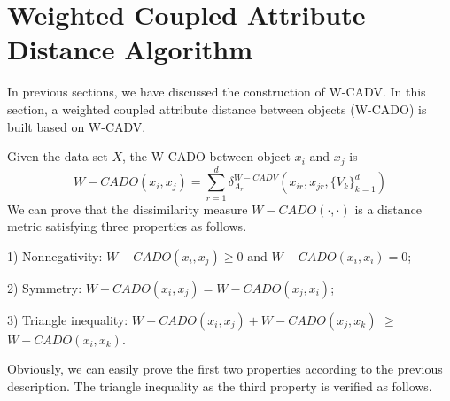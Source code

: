 \documentclass[review]{elsarticle}
\begin{document}
\section{Weighted Coupled Attribute Distance Algorithm}
In previous sections, we have discussed the construction of W-CADV. In this section, a weighted coupled attribute distance between objects (W-CADO) is built based on W-CADV.

Given the data set $X$, the W-CADO between object $x_i$ and $x_j$ is
\begin{equation}
W-CADO(x_i,x_j) = \sum_{r=1}^{d}\delta_{A_r}^{W-CADV}(x_{ir},x_{jr},\{V_k\}_{k = 1} ^ d)
\label{equ23}
\end{equation}
We can prove that the dissimilarity measure $W-CADO(\cdot,\cdot)$ is a distance metric satisfying three properties as follows.

1) Nonnegativity: $W-CADO(x_i,x_j) \geq 0$ and $W-CADO(x_i,x_i) = 0$;

2) Symmetry: $W-CADO(x_i,x_j) = W-CADO(x_j,x_i)$;

3) Triangle inequality: $W-CADO(x_i,x_j) + W-CADO(x_j,x_k)$ $\geq$ $W-CADO(x_i,x_k)$.

Obviously, we can easily prove the first two properties according to the previous description. The triangle inequality as the third property is verified as follows.
\end{document}
